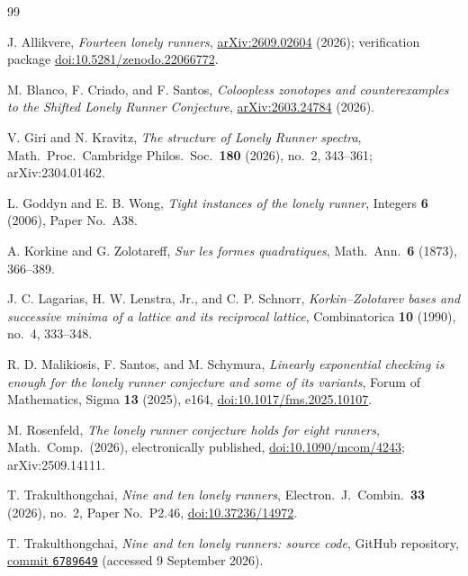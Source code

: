 \documentclass[11pt]{article}
\theoremstyle{definition}
\theoremstyle{remark}
\begin{document}
\begin{thebibliography}{99}
\small
\setlength{\itemsep}{1pt}

J. Allikvere,
\emph{Fourteen lonely runners},
\href{https://arxiv.org/abs/2609.02604}{arXiv:2609.02604} (2026);
verification package
\href{https://doi.org/10.5281/zenodo.22066772}{doi:10.5281/zenodo.22066772}.

M. Blanco, F. Criado, and F. Santos,
\emph{Coloopless zonotopes and counterexamples to the Shifted Lonely
Runner Conjecture},
\href{https://arxiv.org/abs/2603.24784}{arXiv:2603.24784} (2026).

V. Giri and N. Kravitz,
\emph{The structure of Lonely Runner spectra},
Math.\ Proc.\ Cambridge Philos.\ Soc.\ \textbf{180} (2026), no.~2,
343--361; arXiv:2304.01462.

L. Goddyn and E. B. Wong,
\emph{Tight instances of the lonely runner},
Integers \textbf{6} (2006), Paper No.~A38.

A. Korkine and G. Zolotareff,
\emph{Sur les formes quadratiques},
Math.\ Ann.\ \textbf{6} (1873), 366--389.

J. C. Lagarias, H. W. Lenstra, Jr., and C. P. Schnorr,
\emph{Korkin--Zolotarev bases and successive minima of a lattice and its
reciprocal lattice},
Combinatorica \textbf{10} (1990), no.~4, 333--348.

R. D. Malikiosis, F. Santos, and M. Schymura,
\emph{Linearly exponential checking is enough for the lonely runner
conjecture and some of its variants},
Forum of Mathematics, Sigma \textbf{13} (2025), e164,
\href{https://doi.org/10.1017/fms.2025.10107}{doi:10.1017/fms.2025.10107}.

M. Rosenfeld,
\emph{The lonely runner conjecture holds for eight runners},
Math.\ Comp.\ (2026), electronically published,
\href{https://doi.org/10.1090/mcom/4243}{doi:10.1090/mcom/4243};
arXiv:2509.14111.

T. Trakulthongchai,
\emph{Nine and ten lonely runners},
Electron.\ J.\ Combin.\ \textbf{33} (2026), no.~2, Paper No.~P2.46,
\href{https://doi.org/10.37236/14972}{doi:10.37236/14972}.

T. Trakulthongchai,
\emph{Nine and ten lonely runners: source code},
GitHub repository,
\href{https://github.com/t-tanupat/nine-and-ten-lonely-runners/commit/6789649}%
{commit \texttt{6789649}} (accessed 9 September 2026).


\end{thebibliography}
\end{document}
